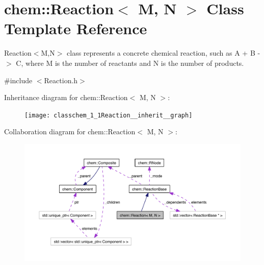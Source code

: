 \hypertarget{classchem_1_1Reaction}{\section{chem\-:\-:Reaction$<$ M, N $>$ Class Template Reference}
\label{classchem_1_1Reaction}
}


Reaction$<$\-M,\-N$>$ class represents a concrete chemical reaction, such as A + B -\/$>$ C, where M is the number of reactants and N is the number of products.  




{\ttfamily \#include $<$Reaction.\-h$>$}



Inheritance diagram for chem\-:\-:Reaction$<$ M, N $>$\-:\nopagebreak
\begin{figure}[H]
\begin{center}
\leavevmode
\texttt{[image: classchem\_1\_1Reaction\_\_inherit\_\_graph]}
\end{center}
\end{figure}


Collaboration diagram for chem\-:\-:Reaction$<$ M, N $>$\-:\nopagebreak
\begin{figure}[H]
\begin{center}
\leavevmode
\includegraphics[width=350pt]{classchem_1_1Reaction__coll__graph}
\end{center}
\end{figure}
